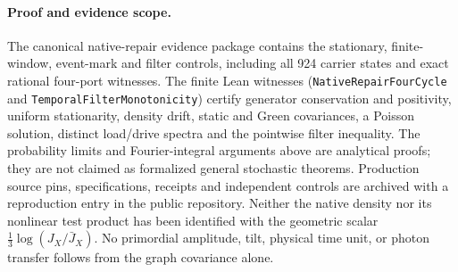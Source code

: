 \paragraph{Proof and evidence scope.}
The canonical native-repair evidence package contains the stationary,
finite-window, event-mark and filter controls, including all 924 carrier
states and exact rational four-port witnesses. The finite Lean witnesses
(\texttt{NativeRepairFourCycle} and \texttt{TemporalFilterMonotonicity})
certify generator conservation and positivity, uniform stationarity,
density drift, static and Green covariances, a Poisson solution, distinct
load/drive spectra and the pointwise filter inequality. The probability
limits and Fourier-integral arguments above are analytical proofs; they
are not claimed as formalized general stochastic theorems. Production
source pins, specifications, receipts and independent controls are archived
with a reproduction entry in the public repository. Neither the native
density nor its nonlinear test product has been identified with the
geometric scalar \(\frac13\log(J_X/\bar J_X)\). No primordial amplitude,
tilt, physical time unit, or photon transfer follows from the graph
covariance alone.

